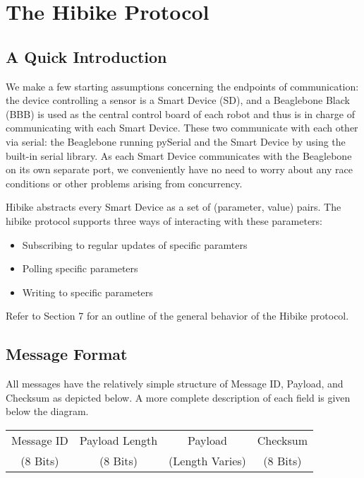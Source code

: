 \documentclass[12pt]{book}
\begin{document}
\section{The Hibike Protocol}
\subsection{A Quick Introduction}
We make a few starting assumptions concerning the endpoints of communication: the device controlling a sensor is a Smart Device (SD), and a Beaglebone Black (BBB) is used as the central control board of each robot and thus is in charge of communicating with each Smart Device. These two communicate with each other via serial: the Beaglebone running pySerial and the Smart Device by using the built-in serial library. As each Smart Device communicates with the Beaglebone on its own separate port, we conveniently have no need to worry about any race conditions or other problems arising from concurrency.

Hibike abstracts every Smart Device as a set of (parameter, value) pairs.
The hibike protocol supports three ways of interacting with these parameters:
\begin{itemize}
\item Subscribing to regular updates of specific paramters
\item Polling specific parameters
\item Writing to specific parameters
\end{itemize}

Refer to Section 7 for an outline of the general behavior of the Hibike protocol.

\subsection{Message Format}

All messages have the relatively simple structure of Message ID, Payload, and Checksum as
depicted below. A more complete description of each field is given below the diagram.

\begin{center}
	\begin{tabular}{|c|c|c|c|}
	\hline
	Message ID & Payload Length & Payload & Checksum \\
	(8 Bits) & (8 Bits) & (Length Varies) & (8 Bits) \\
	\hline
	\end{tabular}
\end{center}
\end{document}
